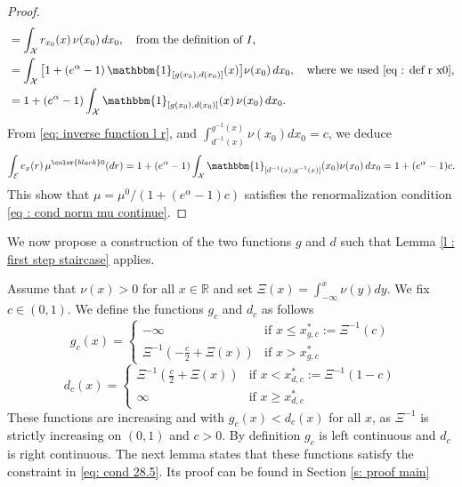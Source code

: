 \documentclass[a4paper, 11pt]{article}
\theoremstyle{definition}
\newcommand{\modar}{\color{black}}
\begin{document}
{{\begin{proof}
\begin{align*}
			 &= \int_\mathcal{X} r_{x_0}(x) \, \nu(x_0)\, dx_0,
			 \quad \text{from the definition of $I$,}			
			 \\
			&= \int_\mathcal{X} \big[ 1 + (e^\alpha - 1)\, 
			\mathbbm{1}_{[g(x_0), d(x_0)]}(x) \big] \nu(x_0)\, dx_0
			,\quad \text{where we used \eqref{eq : def r x0},}		
			 \\
			&= 1 + (e^\alpha - 1) \int_\mathcal{X} 
			\mathbbm{1}_{ [g(x_0), d(x_0)]}(x)\, \nu(x_0)\, dx_0.
		\end{align*}
	From \eqref{eq: inverse function l r}, 
	and  $\int_{d^{-1}(x)}^{g^{-1}(x)} \nu(x_0)dx_0=c$,  we deduce
	\begin{equation*}
		\int_{\mathcal{E}} e_{x}(r)\, \mu^{\modar0}(dr)  
		=  1 + (e^\alpha - 1) \int_\mathcal{X} 
		\mathbbm{1}_{[ d^{-1}(x), g^{-1}(x)]}(x_0) \nu(x_0) \, dx_0
		= 1   + (e^\alpha - 1)c.
	\end{equation*}	
	This show that {\modar $\mu=\mu^0/(1   + (e^\alpha - 1)c)$} satisfies the renormalization condition \eqref{eq : cond norm mu continue}.
	\end{proof}
We now propose a construction of the two functions $g$ and $d$ such that Lemma \ref{l : first step staircase} applies.

Assume that $\nu(x)>0$ for all $x \in \mathbb{R}$ and set $\Xi(x)=\int_{-\infty}^x \nu(y)dy$. We fix $c\in (0,1)$. We define the functions $g_c$ and $d_c$ as follows
\begin{equation}\label{eq : def lc}
	g_c(x)=
	\begin{cases}
		-\infty & \text{if $x \le x^*_{g,c}:=\Xi^{-1}(c)$}
		\\
		\Xi^{-1}(-\frac{c}{2}+\Xi(x)) & \text{if $x >x^*_{g,c}$} %
	\end{cases}
\end{equation}
\begin{equation}\label{eq : def rc}
	d_c(x)=
	\begin{cases}
		\Xi^{-1}(\frac{c}{2}+\Xi(x)) & \text{if $x < x^{*}_{d,c}:=\Xi^{-1}(1-c)$}
\\			\infty & \text{if $x \ge x^{*}_{d,c}$} %
	\end{cases}
\end{equation}
These functions are increasing and with $g_c (x) < d_c(x)$ for all $x$, as $\Xi^{-1}$ is strictly increasing on $(0,1)$ and $c>0$. By definition $g_c$ is left continuous and $d_c$ is right continuous. The next lemma states that these functions satisfy the constraint in \eqref{eq: cond 28.5}. Its proof can be found in Section \ref{s: proof main}

}}
\end{document}
